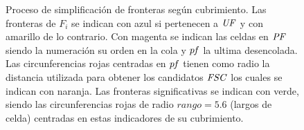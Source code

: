 \begin{figure}[H]
  \caption[Proceso de simplificación de fronteras según cubrimiento.]{Proceso
    de simplificación de fronteras según cubrimiento. Las fronteras de $F_i$ se
    indican con azul si pertenecen a $\mathit{UF}$ y con amarillo de lo contrario.
    Con magenta se indican las celdas en $\mathit{PF}$ siendo la numeración su
    orden en la cola y $\mathit{pf}$ la ultima desencolada. Las
    circunferencias rojas centradas en $\mathit{pf}$ tienen como radio la distancia
    utilizada para obtener los candidatos $\mathit{FSC}$ los cuales se indican con
    naranja. Las fronteras significativas se indican con verde, siendo las
    circunferencias rojas de radio $rango=5.6$ (largos de celda) centradas en estas indicadores de su
  cubrimiento.}\label{fig:ejemploFSCubComp}

\end{figure}
